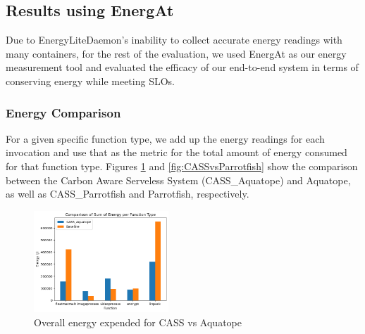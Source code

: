 \documentclass[times, 10pt,twocolumn]{article}
\begin{document}



\subsection{Results using EnergAt}

Due to EnergyLiteDaemon's inability to collect accurate energy readings with many containers, for the rest of the evaluation, we used EnergAt as our energy measurement tool and evaluated the efficacy of our end-to-end system in terms of conserving energy while meeting SLOs. 

\subsubsection{Energy Comparison}
For a given specific function type, we add up the energy readings for each invocation and use that as the metric for the total amount of energy consumed for that function type. Figures \ref{fig:CASSvsAquatope} and \ref{fig:CASSvsParrotfish} show the comparison between the Carbon Aware Serveless System (CASS\_Aquatope) and Aquatope, as well as CASS\_Parrotfish and Parrotfish, respectively. 

\begin{figure}[ht]
   \centering
   \includegraphics[width=0.45\textwidth]{imgs/final_experiment_plots/energy_comparison/aquatope/overall.png}
   \caption{Overall energy expended for CASS vs Aquatope}
   \label{fig:CASSvsAquatope}
 \end{figure}
\end{document}
